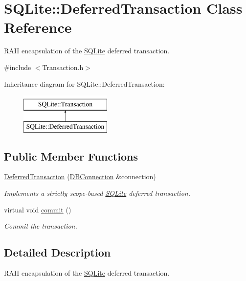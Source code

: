 \hypertarget{a00005}{\section{S\-Q\-Lite\-:\-:Deferred\-Transaction Class Reference}
\label{a00005}
}


R\-A\-I\-I encapsulation of the \hyperlink{a00038}{S\-Q\-Lite} deferred transaction.  




{\ttfamily \#include $<$Transaction.\-h$>$}

Inheritance diagram for S\-Q\-Lite\-:\-:Deferred\-Transaction\-:\begin{figure}[H]
\begin{center}
\leavevmode
\includegraphics[height=2.000000cm]{a00005}
\end{center}
\end{figure}
\subsection*{Public Member Functions}
\begin{DoxyCompactItemize}
\item 
\hyperlink{a00005_ae1b880ce4c3796565b6ea4d492f61202}{Deferred\-Transaction} (\hyperlink{a00004}{D\-B\-Connection} \&connection)
\begin{DoxyCompactList}\small\item\em Implements a strictly scope-\/based \hyperlink{a00038}{S\-Q\-Lite} deferred transaction. \end{DoxyCompactList}\item 
\hypertarget{a00014_a9b251d84198cdc2c0208ad566fec0287}{virtual void \hyperlink{a00014_a9b251d84198cdc2c0208ad566fec0287}{commit} ()}\label{a00014_a9b251d84198cdc2c0208ad566fec0287}

\begin{DoxyCompactList}\small\item\em Commit the transaction. \end{DoxyCompactList}\end{DoxyCompactItemize}


\subsection{Detailed Description}
R\-A\-I\-I encapsulation of the \hyperlink{a00038}{S\-Q\-Lite} deferred transaction. 

